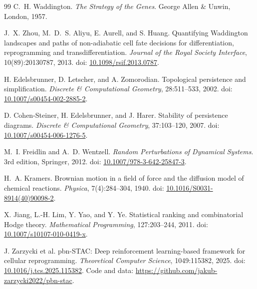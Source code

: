 \documentclass[11pt]{article}
\newcommand{\1}{\mathbf{1}}
\begin{document}
\clearpage
\begin{thebibliography}{99}
C.~H. Waddington. \emph{The Strategy of the Genes}. George Allen \& Unwin, London, 1957.

J.~X. Zhou, M.~D.~S. Aliyu, E. Aurell, and S. Huang.
Quantifying Waddington landscapes and paths of non-adiabatic cell fate decisions for differentiation, reprogramming and transdifferentiation.
\emph{Journal of the Royal Society Interface}, 10(89):20130787, 2013. doi: \href{https://doi.org/10.1098/rsif.2013.0787}{10.1098/rsif.2013.0787}.

H. Edelsbrunner, D. Letscher, and A. Zomorodian.
Topological persistence and simplification. \emph{Discrete \& Computational Geometry}, 28:511--533, 2002. doi: \href{https://doi.org/10.1007/s00454-002-2885-2}{10.1007/s00454-002-2885-2}.

D. Cohen-Steiner, H. Edelsbrunner, and J. Harer.
Stability of persistence diagrams. \emph{Discrete \& Computational Geometry}, 37:103--120, 2007. doi: \href{https://doi.org/10.1007/s00454-006-1276-5}{10.1007/s00454-006-1276-5}.

M.~I. Freidlin and A.~D. Wentzell. \emph{Random Perturbations of Dynamical Systems}. 3rd edition, Springer, 2012. doi: \href{https://doi.org/10.1007/978-3-642-25847-3}{10.1007/978-3-642-25847-3}.

H.~A. Kramers. Brownian motion in a field of force and the diffusion model of chemical reactions. \emph{Physica}, 7(4):284--304, 1940. doi: \href{https://doi.org/10.1016/S0031-8914(40)90098-2}{10.1016/S0031-8914(40)90098-2}.

X. Jiang, L.-H. Lim, Y. Yao, and Y. Ye. Statistical ranking and combinatorial Hodge theory. \emph{Mathematical Programming}, 127:203--244, 2011. doi: \href{https://doi.org/10.1007/s10107-010-0419-x}{10.1007/s10107-010-0419-x}.

J. Zarzycki et al. pbn-STAC: Deep reinforcement learning-based framework for cellular reprogramming. \emph{Theoretical Computer Science}, 1049:115382, 2025. doi: \href{https://doi.org/10.1016/j.tcs.2025.115382}{10.1016/j.tcs.2025.115382}. Code and data: \url{https://github.com/jakub-zarzycki2022/pbn-stac}.


\end{thebibliography}
\end{document}
